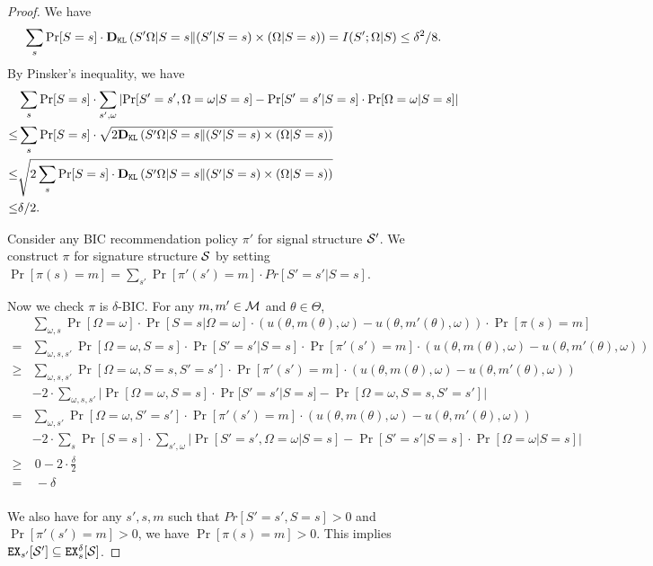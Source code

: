 \begin{proof}
We have 
\[
\sum_{s} \Pr[S=s] \cdot \DKL\left(S'\Omega|S=s \| (S'|S=s) \times (\Omega|S=s) \right) = I(S' ; \Omega|S) \leq \delta^2/8. 
\]
By Pinsker's inequality, we have
\begin{align*}
       &\sum_{s} \Pr[S = s] \cdot  \sum_{s', \omega} \left| \Pr[S' = s', \Omega = \omega| S= s] - \Pr[S'=s'|S=s] \cdot \Pr[\Omega = \omega|S=s]\right| \\
\leq & \sum_{s} \Pr[S=s] \cdot \sqrt{2 \DKL\left(S'\Omega|S=s \| (S'|S=s) \times (\Omega|S=s) \right)  } \\
\leq &  \sqrt{2 \sum_{s} \Pr[S=s] \cdot  \DKL\left(S'\Omega|S=s \| (S'|S=s) \times (\Omega|S=s) \right) } \\
\leq &\delta /2. \\
\end{align*}

Consider any BIC recommendation policy $\pi'$ for signal structure $\S'$. We construct $\pi$ for signature structure $\S$ by setting $\Pr[\pi(s) = m] = \sum_{s'} \Pr[\pi'(s') = m] \cdot Pr[S' = s'|S = s]$. 

Now we check $\pi$ is $\delta$-BIC. For any $m,m' \in \M$ and $\theta \in \varTheta$,
\begin{align*}
& \sum_{\omega,s} \Pr[\Omega= \omega] \cdot \Pr[S = s | \Omega = \omega] \cdot \left(u(\theta, m(\theta), \omega) - u(\theta, m'(\theta), \omega)\right) \cdot  \Pr[\pi(s) = m] \\
=&\sum_{\omega,s,s'} \Pr[\Omega = \omega, S = s] \cdot \Pr[ S'=s'|S= s] \cdot \Pr[\pi'(s') = m]   \cdot \left(u(\theta, m(\theta), \omega) - u(\theta, m'(\theta), \omega)\right)\\
\geq &\sum_{\omega,s,s'} \Pr[\Omega = \omega, S = s, S'=s'] \cdot \Pr[\pi'(s') = m]   \cdot \left(u(\theta, m(\theta), \omega) - u(\theta, m'(\theta),
 \omega)\right)\\
& -2 \cdot \sum_{\omega,s,s'} | \Pr[\Omega = \omega, S = s] \cdot \Pr[ S'=s'|S= s] -  \Pr[\Omega = \omega, S = s, S'=s']| \\
= &\sum_{\omega,s'} \Pr[\Omega = \omega, S'=s'] \cdot \Pr[\pi'(s') = m]   \cdot \left(u(\theta, m(\theta), \omega) - u(\theta, m'(\theta),
 \omega)\right)\\
& -2 \cdot \sum_{s} \Pr[S = s] \cdot  \sum_{s', \omega} \left| \Pr[S' = s', \Omega = \omega| S= s] - \Pr[S'=s'|S=s] \cdot \Pr[\Omega = \omega|S=s]\right| \\
\geq&  ~0- 2 \cdot \frac{\delta}{2}\\
 =& ~-\delta\\
\end{align*}

We also have for any $s', s ,m$ such that $Pr[S' = s',S = s] >0 $ and $\Pr[\pi'(s') = m] >0$, we have $\Pr[\pi(s) = m] > 0$. This implies $\EX_{s'}[\S'] \subseteq \EX^{\delta}_s[\S]$. 
\end{proof}


